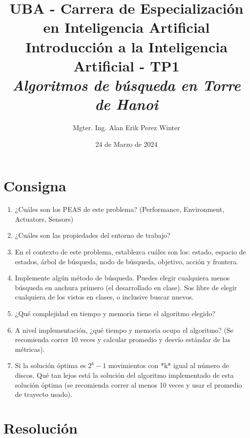 \documentclass[a4paper,11pt]{article}
\title{ UBA - Carrera de Especialización en Inteligencia Artificial\\ 
        Introducción a la Inteligencia Artificial - TP1\\
        \textit{Algoritmos de búsqueda en Torre de Hanoi}}
\author{Mgter. Ing. Alan Erik Perez Winter}
\date{24 de Marzo de 2024}
\begin{document}
\maketitle

\section{Consigna}
\begin{enumerate}
    \item ¿Cuáles son los PEAS de este problema? (Performance, Environment, Actuators, Sensors)
    \item ¿Cuáles son las propiedades del entorno de trabajo?
    \item En el contexto de este problema, establezca cuáles son los: estado, espacio de estados, árbol de búsqueda, nodo de búsqueda, objetivo, acción y frontera.
    \item Implemente algún método de búsqueda. Puedes elegir cualquiera menos búsqueda en anchura primero (el desarrollado en clase). Sos libre de elegir cualquiera de los vistos en clases, o inclusive buscar nuevos.
    \item ¿Qué complejidad en tiempo y memoria tiene el algoritmo elegido?
    \item A nivel implementación, ¿qué tiempo y memoria ocupa el algoritmo? (Se recomienda correr 10 veces y calcular promedio y desvío estándar de las métricas).
    \item Si la solución óptima es $2^k - 1$ movimientos con *k* igual al número de discos. Qué tan lejos está la solución del algoritmo implementado de esta solución óptima (se recomienda correr al menos 10 veces y usar el promedio de trayecto usado). 
\end{enumerate}

\section{Resolución}
\end{document}
